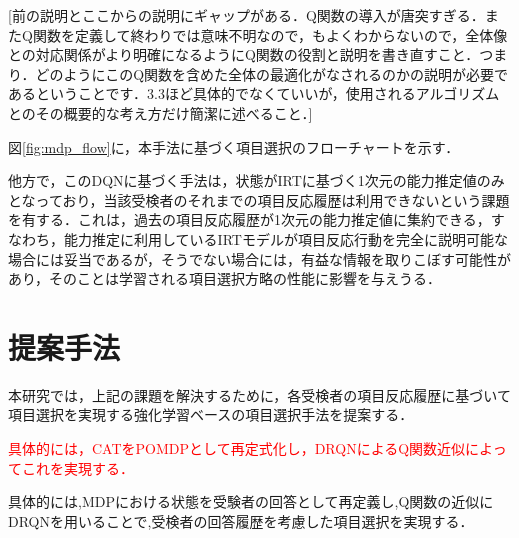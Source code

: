 \documentclass[dvipdfmx,a4j]{jarticle}
\begin{document}
{\color{red}
[前の説明とここからの説明にギャップがある．Q関数の導入が唐突すぎる．またQ関数を定義して終わりでは意味不明なので，もよくわからないので，全体像との対応関係がより明確になるようにQ関数の役割と説明を書き直すこと．つまり．どのようにこのQ関数を含めた全体の最適化がなされるのかの説明が必要であるということです．3.3ほど具体的でなくていいが，使用されるアルゴリズムとのその概要的な考え方だけ簡潔に述べること．]
}

図\ref{fig:mdp_flow}に，本手法に基づく項目選択のフローチャートを示す．


他方で，このDQNに基づく手法は，状態がIRTに基づく1次元の能力推定値のみとなっており，当該受検者のそれまでの項目反応履歴は利用できないという課題を有する．これは，過去の項目反応履歴が1次元の能力推定値に集約できる，すなわち，能力推定に利用しているIRTモデルが項目反応行動を完全に説明可能な場合には妥当であるが，そうでない場合には，有益な情報を取りこぼす可能性があり，そのことは学習される項目選択方略の性能に影響を与えうる．

\section{提案手法}

本研究では，上記の課題を解決するために，各受検者の項目反応履歴に基づいて項目選択を実現する強化学習ベースの項目選択手法を提案する．

\textcolor{red}{
具体的には，CATをPOMDPとして再定式化し，DRQNによるQ関数近似によってこれを実現する．
}

具体的には,MDPにおける状態を受験者の回答として再定義し,Q関数の近似にDRQNを用いることで,受検者の回答履歴を考慮した項目選択を実現する．

\end{document}
